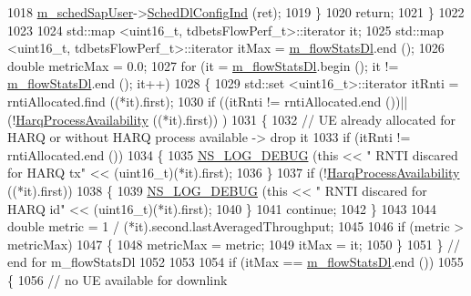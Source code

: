 \begin{DoxyCode}
1018           \hyperlink{classns3_1_1TdBetFfMacScheduler_aac1731b516e0a6e45d76828f6c72eaa5}{m\_schedSapUser}->\hyperlink{classns3_1_1FfMacSchedSapUser_a28f8484af5a32a45ee6c0e51770d83f7}{SchedDlConfigInd} (ret);
1019         \}
1020       \textcolor{keywordflow}{return};
1021     \}
1022 
1023 
1024   std::map <uint16\_t, tdbetsFlowPerf\_t>::iterator it;
1025   std::map <uint16\_t, tdbetsFlowPerf\_t>::iterator itMax = \hyperlink{classns3_1_1TdBetFfMacScheduler_a78d90d229bd176d578a607688cdf69a6}{m\_flowStatsDl}.end ();
1026   \textcolor{keywordtype}{double} metricMax = 0.0;
1027   \textcolor{keywordflow}{for} (it = \hyperlink{classns3_1_1TdBetFfMacScheduler_a78d90d229bd176d578a607688cdf69a6}{m\_flowStatsDl}.begin (); it != \hyperlink{classns3_1_1TdBetFfMacScheduler_a78d90d229bd176d578a607688cdf69a6}{m\_flowStatsDl}.end (); it++)
1028     \{
1029       std::set <uint16\_t>::iterator itRnti = rntiAllocated.find ((*it).first);
1030       \textcolor{keywordflow}{if} ((itRnti != rntiAllocated.end ())||(!\hyperlink{classns3_1_1TdBetFfMacScheduler_ad6d89e73b2b5b261805020cd24796303}{HarqProcessAvailability} ((*it).first))
      )
1031         \{
1032           \textcolor{comment}{// UE already allocated for HARQ or without HARQ process available -> drop it}
1033           \textcolor{keywordflow}{if} (itRnti != rntiAllocated.end ())
1034             \{
1035               \hyperlink{group__logging_ga413f1886406d49f59a6a0a89b77b4d0a}{NS\_LOG\_DEBUG} (\textcolor{keyword}{this} << \textcolor{stringliteral}{" RNTI discared for HARQ tx"} << (uint16\_t)(*it).first);
1036             \}
1037           \textcolor{keywordflow}{if} (!\hyperlink{classns3_1_1TdBetFfMacScheduler_ad6d89e73b2b5b261805020cd24796303}{HarqProcessAvailability} ((*it).first))
1038             \{
1039               \hyperlink{group__logging_ga413f1886406d49f59a6a0a89b77b4d0a}{NS\_LOG\_DEBUG} (\textcolor{keyword}{this} << \textcolor{stringliteral}{" RNTI discared for HARQ id"} << (uint16\_t)(*it).first);
1040             \}
1041           \textcolor{keywordflow}{continue};
1042        \}
1043 
1044       \textcolor{keywordtype}{double} metric = 1 / (*it).second.lastAveragedThroughput;
1045 
1046       \textcolor{keywordflow}{if} (metric > metricMax)
1047         \{
1048           metricMax = metric;
1049           itMax = it;
1050         \}
1051     \} \textcolor{comment}{// end for m\_flowStatsDl}
1052 
1053 
1054   \textcolor{keywordflow}{if} (itMax == \hyperlink{classns3_1_1TdBetFfMacScheduler_a78d90d229bd176d578a607688cdf69a6}{m\_flowStatsDl}.end ())
1055     \{
1056       \textcolor{comment}{// no UE available for downlink }

\end{DoxyCode}
